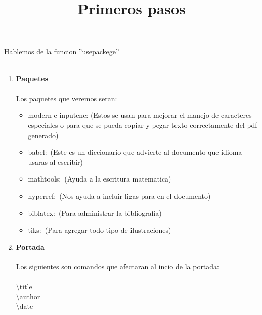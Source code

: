 \documentclass[spanish,12pt,a4paper]{book}%
\begin{document}
\title{Primeros pasos}

{\Large Hablemos de la funcion ''usepackege''}\\\\
\begin{enumerate}
\item \textbf{{Paquetes}}\\\\
	 Los paquetes que veremos seran:
	\begin{itemize}
		\item modern e inputenc:  {\small (Estos se usan para mejorar el manejo de caracteres especiales o para que se pueda copiar y pegar texto correctamente del pdf generado)}
		\item babel:\  {\small (Este es un diccionario que advierte al documento que idioma usaras al escribir)}
		\item mathtools:\  {\small (Ayuda a la escritura matematica)}
		\item hyperref:\  {\small (Nos ayuda a incluir ligas para en el documento)} 
		\item biblatex:\  {\small (Para administrar la bibliografia)}
		\item tiks:\  {\small (Para agregar todo tipo de ilustraciones)}
	\end{itemize}

\item \textbf{{Portada}}\\\\
	Los siguientes son comandos que afectaran al incio de la portada:\label{Tomamos el capitulo o en este caso el item}\\\\
	\textbackslash title\\ \textbackslash author\\ \textbackslash date 


\end{enumerate}
\end{document}
